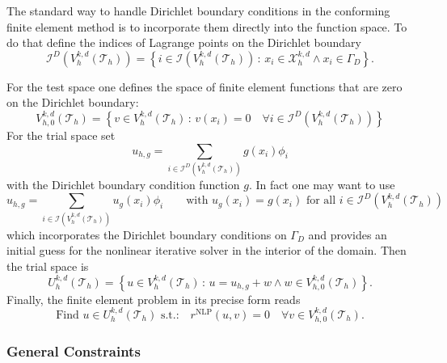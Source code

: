 \documentclass[a4paper,12pt]{article}
\begin{document}
The standard way to handle Dirichlet boundary conditions in the conforming
finite element method is to incorporate them directly into the function space. 
To do that define the indices of Lagrange points on the Dirichlet boundary
\begin{equation*}
\mathcal{I}^D\left(V_h^{k,d}(\mathcal{T}_h)\right) = 
\left\{ i\in\mathcal{I}\left(V_h^{k,d}(\mathcal{T}_h)\right)  \,:\,
x_i\in\mathcal{X}_h^{k,d} \wedge x_i\in\Gamma_D  
\right\} .
\end{equation*}

For the test space one defines the space of finite element
functions that are zero on the Dirichlet boundary:
\begin{equation*}
V_{h,0}^{k,d}(\mathcal{T}_{h}) = \left\{ 
v\in V_{h}^{k,d}(\mathcal{T}_{h}) \,:\, v(x_i) = 0 
\quad \forall i\in\mathcal{I}^D\left(V_h^{k,d}(\mathcal{T}_h)\right)
 \right\}
\end{equation*}
For the trial space set
\begin{equation*}
u_{h,g} = \sum_{i\in \mathcal{I}^D\left(V_h^{k,d}(\mathcal{T}_h)\right)}
g(x_i) \phi_i
\end{equation*}
with the Dirichlet boundary condition function $g$. In fact one may want to
use
\begin{equation*}
u_{h,g} = \sum_{i\in \mathcal{I}\left(V_h^{k,d}(\mathcal{T}_h)\right)}
u_g(x_i) \phi_i \qquad \text{with $u_g(x_i)=g(x_i)$ for all $i\in 
\mathcal{I}^D\left(V_h^{k,d}(\mathcal{T}_h)\right)$}
\end{equation*}
which incorporates the Dirichlet boundary conditions on $\Gamma_D$
and provides an initial guess for the nonlinear iterative solver in the
interior of the domain. Then the trial space is
\begin{equation*}
U_{h}^{k,d}(\mathcal{T}_{h}) = \left\{ u\in V_h^{k,d}(\mathcal{T}_h)
\,:\, u = u_{h,g} + w \wedge w\in V_{h,0}^{k,d}(\mathcal{T}_{h})\right\} .
\end{equation*}
Finally, the finite element problem in its precise form reads
\begin{equation}
\text{Find $u\in U_{h}^{k,d}(\mathcal{T}_{h})$ s.t.:} 
\quad r^{\text{NLP}}(u,v)=0 \quad \forall v\in V_{h,0}^{k,d}(\mathcal{T}_{h}) .
\label{eq:PreciseFEProblem}
\end{equation}

\subsubsection*{General Constraints}
\end{document}
